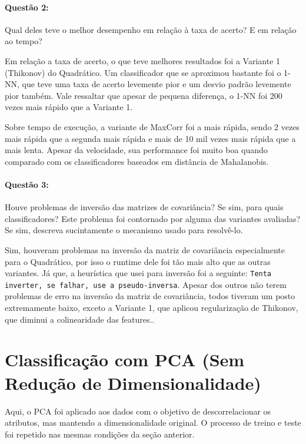 \documentclass[a4paper, 12pt]{article}
\begin{document}
\paragraph{Questão 2:} Qual deles teve o melhor desempenho em relação à taxa de acerto? E em relação ao tempo?

Em relação a taxa de acerto, o que teve melhores resultados foi a Variante 1
(Thikonov) do Quadrático. Um classificador que se aproximou bastante foi o
1-NN, que teve uma taxa de acerto levemente pior e um desvio padrão levemente
pior também. Vale ressaltar que apesar de pequena diferença, o 1-NN foi 200
vezes mais rápido que a Variante 1.

Sobre tempo de execução, a variante de MaxCorr foi a mais rápida, sendo 2 vezes mais rápida que
a segunda mais rápida e mais de 10 mil vezes mais rápida que a mais lenta. Apesar da velocidade,
sua performance foi muito boa quando comparado com os classificadores baseados em distância de Mahalanobis.





\paragraph{Questão 3:} Houve problemas de inversão das matrizes de covariância? Se sim, para quais classificadores? Este problema foi contornado por alguma das variantes avaliadas? Se sim, descreva sucintamente o mecanismo usado para resolvê-lo.

Sim, houveram problemas na inversão da matriz de covariância especialmente para o Quadrático,
por isso o runtime dele foi tão mais alto que as outras variantes. Já que, a heurística que usei para
inversão foi a seguinte: \texttt{Tenta inverter, se falhar, use a pseudo-inversa}. Apesar dos outros não
terem problemas de erro na inversão da matriz de covariância, todos tiveram um posto extremamente baixo,
exceto a Variante 1, que aplicou regularização de Thikonov, que diminui a colinearidade das features..




\section{Classificação com PCA (Sem Redução de Dimensionalidade)}
Aqui, o PCA foi aplicado aos dados com o objetivo de descorrelacionar os atributos, mas mantendo a dimensionalidade original. O processo de treino e teste foi repetido nas mesmas condições da seção anterior.
\end{document}
